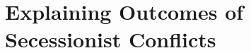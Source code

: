 \documentclass[11pt,letterpaper, notitlepage]{article}
\begin{document}



\section{Explaining Outcomes of Secessionist Conflicts} 
\label{sec:main}
\end{document}

